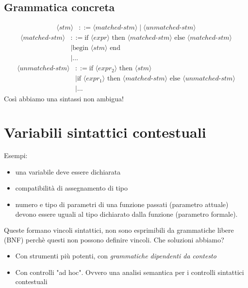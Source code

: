 \documentclass[a4paper,12pt]{article}
\begin{document}
\subsection{Grammatica concreta}
\begin{align*}
  \langle stm \rangle &::= \langle matched\text{-}stm \rangle \mid \langle unmatched\text{-}stm \rangle
\end{align*}
\begin{align*}
  \langle matched\text{-}stm \rangle &::= \text{if } \langle expr \rangle \text{ then } \langle matched\text{-}stm \rangle \text{ else } \langle matched\text{-}stm \rangle \\
  &\mid \text{begin } \langle stm \rangle \text{ end} \\
  &\mid \dots
\end{align*}
\begin{align*}
  \langle unmatched\text{-}stm \rangle &::= \text{if } \langle expr_2 \rangle \text{ then } \langle stm \rangle \\
  &\mid \text{if } \langle expr_1 \rangle \text{ then } \langle matched\text{-}stm \rangle \text{ else } \langle unmatched\text{-}stm \rangle \\
  &\mid \dots
\end{align*}
Così abbiamo una sintassi non ambigua!
\section{Variabili sintattici contestuali}
Esempi: 
\begin{itemize}
  \item una variabile deve essere dichiarata
  \item compatibilità di assegnamento di tipo
  \item numero e tipo di parametri di una funzione passati (parametro attuale) devono essere uguali al tipo dichiarato dalla funzione (parametro formale).
\end{itemize}
Queste formano vincoli sintattici, non sono esprimibili da grammatiche libere (BNF) perchè questi non possono definire vincoli. Che soluzioni abbiamo?
\begin{itemize}
  \item Con strumenti più potenti, con \textit{grammatiche dipendenti da contesto}
  \item Con controlli "ad hoc". Ovvero una analisi semantica per i controlli sintattici contestuali
\end{itemize}
\end{document}
